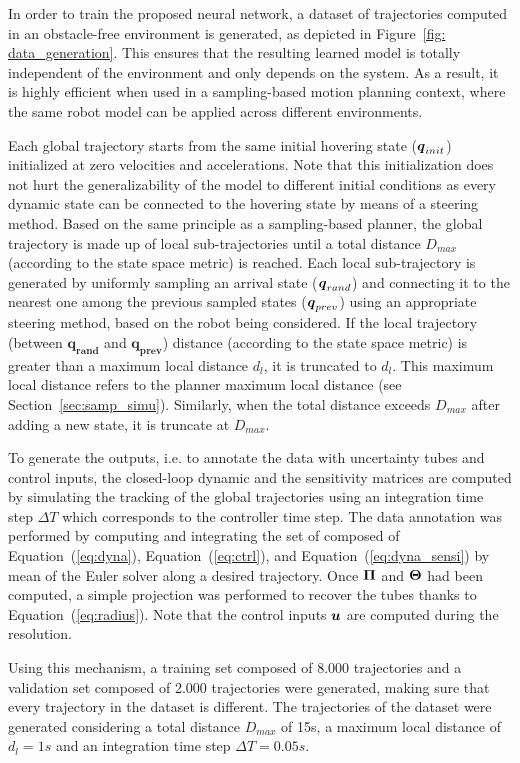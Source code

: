 In order to train the proposed neural network, a dataset of trajectories computed in an obstacle-free environment is generated, as depicted in Figure~\ref{fig: data_generation}.
This ensures that the resulting learned model is totally independent of the environment and only depends on the system.
As a result, it is highly efficient when used in a sampling-based motion planning context, where the same robot model can be applied across different environments.

Each global trajectory starts from the same initial hovering state ($\boldsymbol{q}_{init}$) initialized at zero velocities and accelerations.
Note that this initialization does not hurt the generalizability of the model to different initial conditions as every dynamic state can be connected to the hovering state by means of a steering method.
Based on the same principle as a sampling-based planner, the global trajectory is made up of local sub-trajectories until a total distance $D_{max}$ (according to the state space metric) is reached.
Each local sub-trajectory is generated by uniformly sampling an arrival state ($\boldsymbol{q}_{rand}$) and connecting it to the nearest one among the previous sampled states ($\boldsymbol{q}_{prev}$) using an appropriate steering method, based on the robot being considered.
If the local trajectory (between $\boldsymbol{q_{rand}}$ and $\boldsymbol{q_{prev}}$) distance (according to the state space metric) is greater than a maximum local distance $d_l$, it is truncated to $d_l$. 
This maximum local distance refers to the planner maximum local distance (see Section~\ref{sec:samp_simu}).
Similarly, when the total distance exceeds $D_{max}$ after adding a new state, it is truncate at $D_{max}$.

To generate the outputs, i.e. to annotate the data with uncertainty tubes and control inputs, the closed-loop dynamic and the sensitivity matrices are computed by simulating the tracking of the global trajectories using an integration time step $\Delta T$ which corresponds to the controller time step.
The data annotation was performed by computing and integrating the set of  composed of Equation~(\ref{eq:dyna}), Equation~(\ref{eq:ctrl}), and Equation~(\ref{eq:dyna_sensi}) by mean of the Euler  solver along a desired trajectory. 
Once $\boldsymbol{\Pi}$ and $\boldsymbol{\Theta}$ had been computed, a simple projection was performed to recover the tubes thanks to Equation~(\ref{eq:radius}).
Note that the control inputs $\boldsymbol{u}$ are computed during the  resolution.

Using this mechanism, a training set composed of 8.000 trajectories and a validation set composed of 2.000 trajectories were generated, making sure that every trajectory in the dataset is different.
The trajectories of the dataset were generated considering a total distance $D_{max}$ of 15s, a maximum local distance of $d_l = 1s$ and an integration time step $\Delta T = 0.05s$. 

